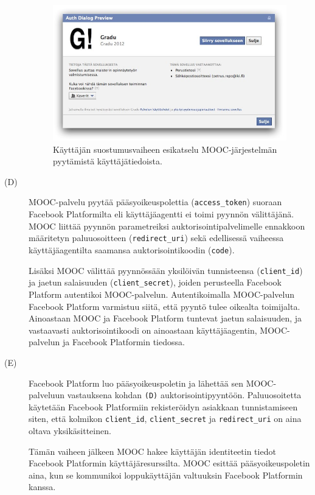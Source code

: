 \documentclass[finnish,gradu]{tktltiki}
\begin{document}
\begin{description}

  \begin{figure}
    \centering
    \includegraphics[width=1.0\textwidth]{images/facebook_auth_dialog.jpg}
    \caption[MOOC-järjestelmän pyytämät käyttäjätiedot.]{Käyttäjän suostumusvaiheen esikatselu MOOC-järjestelmän pyytämistä käyttäjätiedoista.}
    \label{fig:facebook_auth_dialog}
  \end{figure}


  \item[(D)]
    MOOC-palvelu pyytää pääsyoikeuspolettia (\verb!access_token!) suoraan Facebook Platformilta eli käyttäjäagentti ei toimi pyynnön välittäjänä. MOOC liittää pyynnön parametreiksi auktorisointipalvelimelle ennakkoon määritetyn paluuosoitteen (\verb!redirect_uri!) sekä edellisessä vaiheessa käyttäjäagentilta saamansa auktorisointikoodin (\verb!code!).

    Lisäksi MOOC välittää pyynnössään yksilöivän tunnisteensa (\verb!client_id!) ja jaetun salaisuuden (\verb!client_secret!), joiden perusteella Facebook Platform autentikoi MOOC-palvelun. Autentikoimalla MOOC-palvelun Facebook Platform varmistuu siitä, että pyyntö tulee oikealta toimijalta. Ainoastaan MOOC ja Facebook Platform tuntevat jaetun salaisuuden, ja vastaavasti auktorisointikoodi on ainoastaan käyttäjäagentin, MOOC-palvelun ja Facebook Platformin tiedossa.



  \item[(E)]
  Facebook Platform luo pääsyoikeuspoletin ja lähettää sen MOOC-pal\-veluun vastauksena kohdan \verb!(D)! auktorisointipyyntöön. Paluuosoitetta käytetään Facebook Platformiin rekisteröidyn asiakkaan tunnistamiseen siten, että kolmikon \verb!client_id!, \verb!client_secret! ja \verb!redirect_uri! on aina oltava yksikäsitteinen.

  Tämän vaiheen jälkeen MOOC hakee käyttäjän identiteetin tiedot Facebook Platformin käyttäjäresurssilta. MOOC esittää pääsyoikeuspoletin aina, kun se kommunikoi loppukäyttäjän valtuuksin Facebook Platformin kanssa.


  \end{description}
\end{document}

